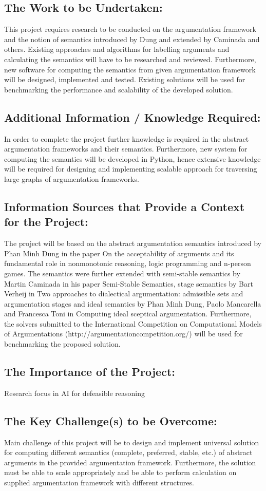 \subsection{The Work to be Undertaken:}
This project requires research to be conducted on the argumentation framework and the notion of semantics introduced by Dung and extended by Caminada and others. Existing approaches and algorithms for labelling arguments and calculating the semantics will have to be researched and reviewed. Furthermore, new software for computing the semantics from given argumentation framework will be designed, implemented and tested. Existing solutions will be used for benchmarking the performance and scalability of the developed solution.

\subsection{Additional Information / Knowledge Required:}
In order to complete the project further knowledge is required in the abstract argumentation frameworks and their semantics. Furthermore, new system for computing the semantics will be developed in Python, hence extensive knowledge will be required for designing and implementing scalable approach for traversing large graphs of argumentation frameworks. 

\subsection{Information Sources that Provide a Context for the Project:}
The project will be based on the abstract argumentation semantics introduced by Phan Minh Dung in the paper On the acceptability of arguments and its fundamental role in nonmonotonic reasoning, logic programming and n-person games. The semantics were further extended with semi-stable semantics by Martin Caminada in his paper Semi-Stable Semantics, stage semantics by Bart Verheij in Two approaches to dialectical argumentation: admissible sets and argumentation stages and ideal semantics by Phan Minh Dung, Paolo Mancarella and Francesca Toni in Computing ideal sceptical argumentation. Furthermore, the solvers submitted to the International Competition on Computational Models of Argumentations (http://argumentationcompetition.org/) will be used for benchmarking the proposed solution. 

\subsection{The Importance of the Project:}
Research focus in AI for defeasible reasoning

\subsection{The Key Challenge(s) to be Overcome:}
Main challenge of this project will be to design and implement universal solution for computing different semantics (complete, preferred, stable, etc.) of abstract arguments in the provided argumentation framework. Furthermore, the solution must be able to scale appropriately and be able to perform calculation on supplied argumentation framework with different structures.
